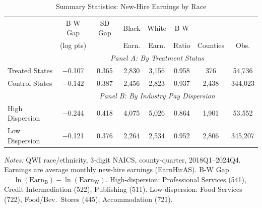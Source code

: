 \begin{table}[t]
\centering
\caption{Summary Statistics: New-Hire Earnings by Race}
\label{tab:summary}
\scriptsize
\begin{tabular}{lccccccc}
\toprule
 & B-W Gap & SD Gap & Black & White & B-W & & \\
 & (log pts) & & Earn. & Earn. & Ratio & Counties & Obs. \\
\midrule
 & \multicolumn{7}{c}{\textit{Panel A: By Treatment Status}} \\
\midrule
Treated States & $-$0.107 & 0.365 & 2,830 & 3,156 & 0.958 & 376 & 54,736 \\
Control States & $-$0.142 & 0.387 & 2,456 & 2,823 & 0.937 & 2,438 & 344,023 \\
\addlinespace
 & \multicolumn{7}{c}{\textit{Panel B: By Industry Pay Dispersion}} \\
\midrule
High Dispersion & $-$0.244 & 0.418 & 4,075 & 5,026 & 0.864 & 1,901 & 53,552 \\
Low Dispersion & $-$0.121 & 0.376 & 2,264 & 2,534 & 0.952 & 2,806 & 345,207 \\
\bottomrule
\end{tabular}
\par\vspace{0.3em}
{\scriptsize \textit{Notes:} QWI race/ethnicity, 3-digit NAICS, county-quarter, 2018Q1--2024Q4. Earnings are average monthly new-hire earnings (EarnHirAS). B-W Gap $= \ln(\text{Earn}_{\text{B}}) - \ln(\text{Earn}_{\text{W}})$. High-dispersion: Professional Services (541), Credit Intermediation (522), Publishing (511). Low-dispersion: Food Services (722), Food/Bev.\ Stores (445), Accommodation (721).}
\end{table}
